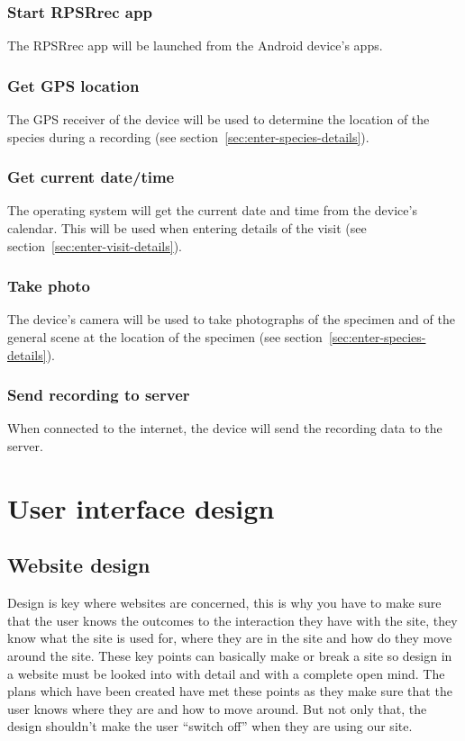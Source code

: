 \documentclass[12pt]{article}
\begin{document}
  	\subsubsection{Start RPSRrec app}
  		The RPSRrec app will be launched from the Android device's apps.
    \subsubsection{Get GPS location}
    	\label{sec:get-gps}
    	The GPS receiver of the device will be used to determine the location of the species during a recording (see section~\ref{sec:enter-species-details}).
  	\subsubsection{Get current date/time}
  		\label{sec:get-date-time}
  		The operating system will get the current date and time from the device's calendar. This will be used when entering details of the visit (see section~\ref{sec:enter-visit-details}).
    \subsubsection{Take photo}
    	\label{sec:take-photo}
    	The device's camera will be used to take photographs of the specimen and of the general scene at the location of the specimen (see section~\ref{sec:enter-species-details}).
    \subsubsection{Send recording to server}
    	When connected to the internet, the device will send the recording data to the server.

\section{User interface design}
	\subsection{Website design}
		Design is key where websites are concerned, this is why you have to make sure that the user knows the outcomes to the interaction they have with the site, they know what the site is used for, where they are in the site and how do they move around the site. These key points can basically make or break a site so design in a website must be looked into with detail and with a complete open mind. The plans which have been created have met these points as they make sure that the user knows where they are and how to move around. But not only that, the design shouldn’t make the user “switch off” when they are using our site.
		
\end{document}
